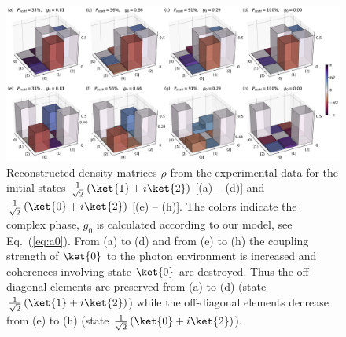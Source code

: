 \documentclass[
aps,prl,
reprint,
a4paper,
superscriptaddress,
floatfix,
]{revtex4-1}
\begin{document}
\begin{figure}[b]
\includegraphics[width=\linewidth]{rho_phase_total.pdf}
\caption{\label{fig:rho}%
Reconstructed density matrices $\rho$ from the experimental data for the initial states 
$\frac{1}{\sqrt{2}}\left(\ket{1} + i\ket{2}\right)$ [(a) -- (d)] and $\frac{1}{\sqrt{2}}\left(\ket{0} + i\ket{2}\right)$ [(e) -- (h)]. The colors indicate the complex phase,
$g_0$ is calculated according to our model, see Eq.~(\ref{eq:a0}).
From (a) to (d) and from (e) to (h) the coupling strength of $\ket{0}$ to the photon environment is increased and coherences involving state $\ket{0}$ are destroyed.
Thus the off-diagonal elements are preserved from (a) to (d) (state 
$\frac{1}{\sqrt{2}}\left(\ket{1} + i\ket{2}\right)$) while the off-diagonal elements decrease from
 (e) to (h) (state $\frac{1}{\sqrt{2}}\left(\ket{0} + i\ket{2}\right)$).}
\end{figure}
\end{document}
